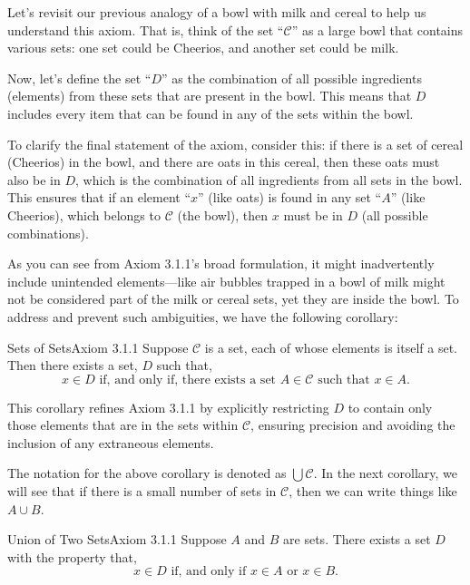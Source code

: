 Let's revisit our previous analogy of a bowl with milk and cereal to help us understand this axiom. That is, think of the set ``$\mathcal{C}$'' as a large bowl that contains various sets: one set could be Cheerios, and another set could be milk.

Now, let's define the set ``$D$'' as the combination of all possible ingredients (elements) from these sets that are present in the bowl. This means that $D$ includes every item that can be found in any of the sets within the bowl.

To clarify the final statement of the axiom, consider this: if there is a set of cereal (Cheerios) in the bowl, and there are oats in this cereal, then these oats must also be in $D$, which is the combination of all ingredients from all sets in the bowl. This ensures that if an element ``$x$'' (like oats) is found in any set ``$A$'' (like Cheerios), which belongs to $\mathcal{C}$ (the bowl), then $x$ must be in $D$ (all possible combinations). 

As you can see from Axiom 3.1.1's broad formulation, it might inadvertently include unintended elements---like air bubbles trapped in a bowl of milk might not be considered part of the milk or cereal sets, yet they are inside the bowl. To address and prevent such ambiguities, we have the following corollary:

\begin{corollary}
    {Sets of Sets}{Axiom 3.1.1} Suppose $\mathcal{C}$ is a set, each of whose elements is itself a set. Then there exists a set, $D$ such that, $$x \in D \text { if, and only if, there exists a set } A \in \mathcal{C} \text{ such that } x \in A.$$
\end{corollary}

This corollary refines Axiom 3.1.1 by explicitly restricting $D$ to contain only those elements that are in the sets within $\mathcal{C}$, ensuring precision and avoiding the inclusion of any extraneous elements. 

The notation for the above corollary is denoted as $\bigcup \mathcal{C}$. In the next corollary, we will see that if there is a small number of sets in $\mathcal{C}$, then we can write things like $A\cup B$.

\begin{corollary}
    {Union of Two Sets}{Axiom 3.1.1} Suppose $A$ and $B$ are sets. There exists a set $D$ with the property that, $$x \in D \text{ if, and only if } x \in A \text{ or } x \in B.$$
\end{corollary}

